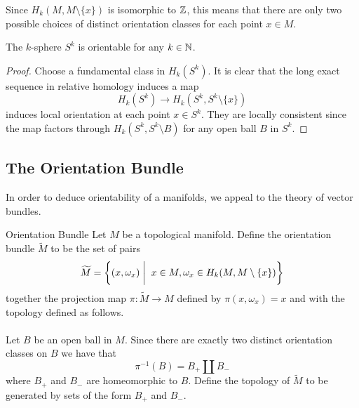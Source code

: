\documentclass[a4paper]{article}
\begin{document}
Since $H_k(M,M\setminus\{x\})$ is isomorphic to $\mathbb{Z}$, this means that there are only two possible choices of distinct orientation classes for each point $x\in M$. 

\begin{lmm}{}{} The $k$-sphere $S^k$ is orientable for any $k\in\mathbb{N}$. \tcbline
\begin{proof}
Choose a fundamental class in $H_k(S^k)$. It is clear that the long exact sequence in relative homology induces a map $$H_k(S^k)\to H_k(S^k,S^k\setminus\{x\})$$ induces local orientation at each point $x\in S^k$. They are locally consistent since the map factors through $H_k(S^k,S^k\setminus B)$ for any open ball $B$ in $S^k$. 
\end{proof}
\end{lmm}

\subsection{The Orientation Bundle}
In order to deduce orientability of a manifolds, we appeal to the theory of vector bundles. 

\begin{defn}{Orientation Bundle}{} Let $M$ be a topological manifold. Define the orientation bundle $\widetilde{M}$ to be the set of pairs $$\widetilde{M}=\left\{(x,\omega_x)\;\bigg{|}\;\; x\in M, \omega_x\in H_k(M,M\setminus\{x\})\right\}$$ together the projection map $\pi:\widetilde{M}\to M$ defined by $\pi(x,\omega_x)=x$ and with the topology defined as follows. \\~\\

Let $B$ be an open ball in $M$. Since there are exactly two distinct orientation classes on $B$ we have that $$\pi^{-1}(B)=B_+\amalg B_-$$ where $B_+$ and $B_-$ are homeomorphic to $B$. Define the topology of $\widetilde{M}$ to be generated by sets of the form $B_+$ and $B_-$. 
\end{defn}
\end{document}
